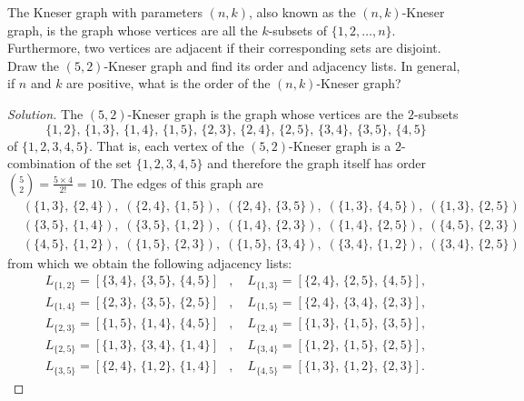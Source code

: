 \begin{example}
The Kneser graph with parameters $(n,k)$, also
known as the $(n,k)$-Kneser graph, is the graph
whose vertices are all the $k$-subsets of $\{1, 2, \dots,
n\}$. Furthermore, two vertices are adjacent if their corresponding
sets are disjoint. Draw the $(5,2)$-Kneser graph
and find its order and adjacency lists. In
general, if $n$ and $k$ are positive, what is the order of the
$(n,k)$-Kneser graph?
\end{example}

\begin{proof}[Solution]
The $(5,2)$-Kneser graph is the graph whose
vertices are the $2$-subsets
\[
\{1,2\},\, \{1,3\},\, \{1,4\},\, \{1,5\},\,
\{2,3\},\, \{2,4\},\, \{2,5\},\,
\{3,4\},\, \{3,5\},\,
\{4,5\}
\]
of $\{1, 2, 3, 4, 5\}$. That is, each vertex of the
$(5,2)$-Kneser graph is a $2$-combination of the
set $\{1, 2, 3, 4, 5\}$ and therefore the graph itself has order
$\binom{5}{2} = \frac{5 \times 4}{2!} = 10$. The edges of this graph
are
\begin{align*}
& (\{1,3\},\, \{2,4\}),\;
  (\{2,4\},\, \{1,5\}),\;
  (\{2,4\},\, \{3,5\}),\;
  (\{1,3\},\, \{4,5\}),\;
  (\{1,3\},\, \{2,5\}) \\[4pt]
& (\{3,5\},\, \{1,4\}),\;
  (\{3,5\},\, \{1,2\}),\;
  (\{1,4\},\, \{2,3\}),\;
  (\{1,4\},\, \{2,5\}),\;
  (\{4,5\},\, \{2,3\}) \\[4pt]
& (\{4,5\},\, \{1,2\}),\;
  (\{1,5\},\, \{2,3\}),\;
  (\{1,5\},\, \{3,4\}),\;
  (\{3,4\},\, \{1,2\}),\;
  (\{3,4\},\, \{2,5\})
\end{align*}
from which we obtain the following adjacency lists:
\begin{align*}
L_{\{1,2\}} = [\{3,4\},\, \{3,5\},\, \{4,5\}]
&,\quad
L_{\{1,3\}} = [\{2,4\},\, \{2,5\},\, \{4,5\}], \\[4pt]
L_{\{1,4\}} = [\{2,3\},\, \{3,5\},\, \{2,5\}]
&,\quad
L_{\{1,5\}} = [\{2,4\},\, \{3,4\},\, \{2,3\}], \\[4pt]
L_{\{2,3\}} = [\{1,5\},\, \{1,4\},\, \{4,5\}]
&,\quad
L_{\{2,4\}} = [\{1,3\},\, \{1,5\},\, \{3,5\}], \\[4pt]
L_{\{2,5\}} = [\{1,3\},\, \{3,4\},\, \{1,4\}]
&,\quad
L_{\{3,4\}} = [\{1,2\},\, \{1,5\},\, \{2,5\}], \\[4pt]
L_{\{3,5\}} = [\{2,4\},\, \{1,2\},\, \{1,4\}]
&,\quad
L_{\{4,5\}} = [\{1,3\},\, \{1,2\},\, \{2,3\}].
\end{align*}

\end{proof}
